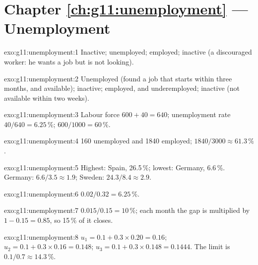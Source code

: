 \section*{Chapter \ref{ch:g11:unemployment} --- Unemployment}

\begin{solution}{exo:g11:unemployment:1}
Inactive; unemployed; employed; inactive (a discouraged worker: he wants a job but is not looking).
\end{solution}

\begin{solution}{exo:g11:unemployment:2}
Unemployed (found a job that starts within three months, and available); inactive; employed, and underemployed; inactive (not available within two weeks).
\end{solution}

\begin{solution}{exo:g11:unemployment:3}
Labour force $600 + 40 = 640$; unemployment rate $40/640 = 6.25\,\%$;  $600/1000 = 60\,\%$.
\end{solution}

\begin{solution}{exo:g11:unemployment:4}
160 unemployed and 1840 employed;  $1840/3000 \approx 61.3\,\%$.
\end{solution}

\begin{solution}{exo:g11:unemployment:5}
Highest: Spain, 26.5\,\%; lowest: Germany, 6.6\,\%. Germany: $6.6/3.5 \approx 1.9$; Sweden: $24.3/8.4 \approx 2.9$.
\end{solution}

\begin{solution}{exo:g11:unemployment:6}
$0.02/0.32 = 6.25\,\%$.
\end{solution}

\begin{solution}{exo:g11:unemployment:7}
$0.015/0.15 = 10\,\%$; each month the gap is multiplied by $1 - 0.15 = 0.85$, so 15\,\% of it closes.
\end{solution}

\begin{solution}{exo:g11:unemployment:8}
$u_1 = 0.1 + 0.3 \times 0.20 = 0.16$; $u_2 = 0.1 + 0.3 \times 0.16 = 0.148$; $u_3 = 0.1 + 0.3 \times 0.148 = 0.1444$. The limit is $0.1/0.7 \approx 14.3\,\%$.
\end{solution}

